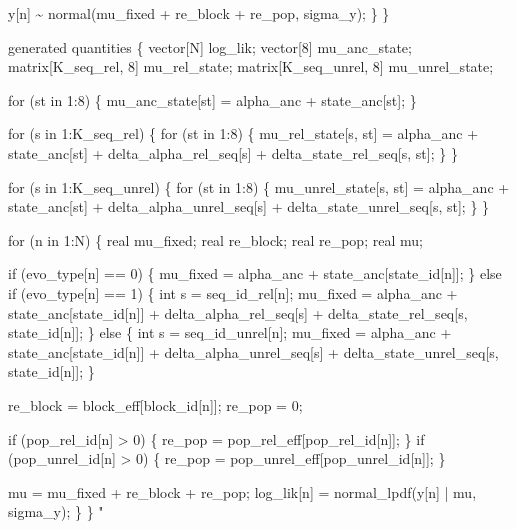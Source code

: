 \documentclass[
]{article}
\newenvironment{Shaded}{\begin{snugshade}}{\end{snugshade}}
\newcommand{\StringTok}[1]{\textcolor[rgb]{0.31,0.60,0.02}{#1}}
\begin{document}
\begin{Shaded}
\begin{Highlighting}[]
\StringTok{    y[n] \textasciitilde{} normal(mu\_fixed + re\_block + re\_pop, sigma\_y);}
\StringTok{  \}}
\StringTok{\}}

\StringTok{generated quantities \{}
\StringTok{  vector[N] log\_lik;}
\StringTok{  vector[8] mu\_anc\_state;}
\StringTok{  matrix[K\_seq\_rel, 8] mu\_rel\_state;}
\StringTok{  matrix[K\_seq\_unrel, 8] mu\_unrel\_state;}

\StringTok{  for (st in 1:8) \{}
\StringTok{    mu\_anc\_state[st] = alpha\_anc + state\_anc[st];}
\StringTok{  \}}

\StringTok{  for (s in 1:K\_seq\_rel) \{}
\StringTok{    for (st in 1:8) \{}
\StringTok{      mu\_rel\_state[s, st] =}
\StringTok{        alpha\_anc +}
\StringTok{        state\_anc[st] +}
\StringTok{        delta\_alpha\_rel\_seq[s] +}
\StringTok{        delta\_state\_rel\_seq[s, st];}
\StringTok{    \}}
\StringTok{  \}}

\StringTok{  for (s in 1:K\_seq\_unrel) \{}
\StringTok{    for (st in 1:8) \{}
\StringTok{      mu\_unrel\_state[s, st] =}
\StringTok{        alpha\_anc +}
\StringTok{        state\_anc[st] +}
\StringTok{        delta\_alpha\_unrel\_seq[s] +}
\StringTok{        delta\_state\_unrel\_seq[s, st];}
\StringTok{    \}}
\StringTok{  \}}

\StringTok{  for (n in 1:N) \{}
\StringTok{    real mu\_fixed;}
\StringTok{    real re\_block;}
\StringTok{    real re\_pop;}
\StringTok{    real mu;}

\StringTok{    if (evo\_type[n] == 0) \{}
\StringTok{      mu\_fixed =}
\StringTok{        alpha\_anc +}
\StringTok{        state\_anc[state\_id[n]];}
\StringTok{    \} else if (evo\_type[n] == 1) \{}
\StringTok{      int s = seq\_id\_rel[n];}
\StringTok{      mu\_fixed =}
\StringTok{        alpha\_anc +}
\StringTok{        state\_anc[state\_id[n]] +}
\StringTok{        delta\_alpha\_rel\_seq[s] +}
\StringTok{        delta\_state\_rel\_seq[s, state\_id[n]];}
\StringTok{    \} else \{}
\StringTok{      int s = seq\_id\_unrel[n];}
\StringTok{      mu\_fixed =}
\StringTok{        alpha\_anc +}
\StringTok{        state\_anc[state\_id[n]] +}
\StringTok{        delta\_alpha\_unrel\_seq[s] +}
\StringTok{        delta\_state\_unrel\_seq[s, state\_id[n]];}
\StringTok{    \}}

\StringTok{    re\_block = block\_eff[block\_id[n]];}
\StringTok{    re\_pop = 0;}

\StringTok{    if (pop\_rel\_id[n] \textgreater{} 0) \{}
\StringTok{      re\_pop = pop\_rel\_eff[pop\_rel\_id[n]];}
\StringTok{    \}}
\StringTok{    if (pop\_unrel\_id[n] \textgreater{} 0) \{}
\StringTok{      re\_pop = pop\_unrel\_eff[pop\_unrel\_id[n]];}
\StringTok{    \}}

\StringTok{    mu = mu\_fixed + re\_block + re\_pop;}
\StringTok{    log\_lik[n] = normal\_lpdf(y[n] | mu, sigma\_y);}
\StringTok{  \}}
\StringTok{\}}
\StringTok{"}
\end{Highlighting}
\end{Shaded}
\end{document}
